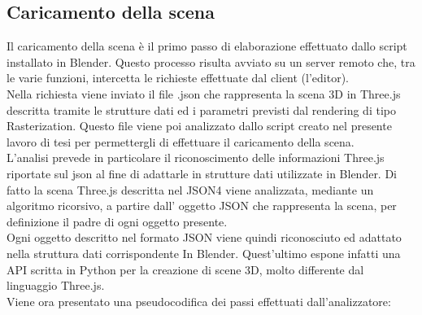\subsection{Caricamento della scena}
Il caricamento della scena è il primo passo di elaborazione effettuato dallo script installato in Blender. Questo processo risulta avviato su un server remoto che, tra le varie funzioni, intercetta le richieste effettuate dal client (l’editor).
\\
Nella richiesta viene inviato il file .json che rappresenta la scena 3D in Three.js descritta tramite le strutture dati ed i parametri previsti dal rendering di tipo Rasterization.
Questo file viene poi analizzato dallo script creato nel presente lavoro di tesi per permettergli di effettuare il caricamento della scena.
\\
L’analisi prevede in particolare il riconoscimento  delle informazioni Three.js riportate sul json al fine di adattarle in strutture dati utilizzate in Blender.
Di fatto la scena Three.js descritta nel JSON4 viene analizzata, mediante un algoritmo ricorsivo, a partire dall’ oggetto JSON che rappresenta la scena, per definizione il padre di ogni oggetto presente.
\\
Ogni oggetto descritto nel formato JSON viene quindi riconosciuto ed adattato nella struttura dati corrispondente In Blender. Quest’ultimo espone infatti una API scritta in Python per la creazione di scene 3D, molto differente dal linguaggio Three.js.
\\
Viene ora presentato una pseudocodifica dei passi effettuati dall’analizzatore:





